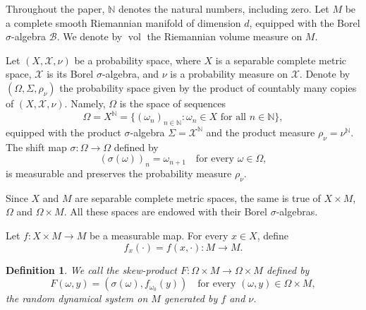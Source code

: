 \documentclass[a4paper,12pt,reqno]{amsart}
\numberwithin{equation}{section}
\newtheorem{defn}[theorem]{Definition}
\newcommand{\cal}{\mathcal}
\newcommand{\BB}{{\cal B}}
\newcommand{\XX}{{\cal X}}
\newcommand{\Nn}{{\mathbb{N}}}
\begin{document}

Throughout the paper, $\Nn$ denotes the natural numbers, including zero. Let $M$ be a complete smooth Riemannian manifold of dimension $d$, equipped
with the Borel $\sigma$-algebra $\BB$. We denote by $\operatorname{vol}$ the Riemannian volume measure on $M$.

Let $(X, \XX, \nu)$ be a probability space, where $X$ is a separable complete metric space, $\XX$ is its Borel $\sigma$-algebra, and $\nu$ is a probability measure on $\XX$. Denote by $(\Omega,\Sigma,\rho_\nu)$ the probability space given by the product of countably many copies of $(X, \XX, \nu)$. Namely, $\Omega$ is the space of sequences 
\[
\Omega = X^{\Nn} = \{(\omega_n)_{n \in \Nn} \colon \omega_n \in X \text{ for all } n \in  \Nn\},
\] 
equipped with the product $\sigma$-algebra $\Sigma = \XX^{\Nn}$ and the product measure $\rho_\nu = \nu^{\Nn}$. The shift map $\sigma \colon \Omega \to \Omega$ defined by
\[(\sigma(\omega))_n = \omega_{n+1} \quad \text{for every } \omega \in \Omega,\] 
is measurable and preserves the probability measure $\rho_\nu$.

Since $X$ and $M$ are separable complete metric spaces, the same is true of $X\times M$, $\Omega$ and $\Omega\times M$. All these spaces are endowed
with their Borel $\sigma$-algebras.






Let $f \colon X \times M \to M$ be a measurable map. For every $x \in X$, define 
\[
f_x(\cdot)=f(x,\cdot) \colon M \to M.
\]

\begin{defn}
We call the skew-product $F \colon \Omega \times M \to \Omega \times M$ defined by
\[
F(\omega,y)=(\sigma(\omega),f_{\omega_0}(y)) \quad  \text{for every } (\omega,y) \in \Omega \times M,
\]  
the \emph{random dynamical system on $M$ generated by $f$ and $\nu$}.
\end{defn}
\end{document}
